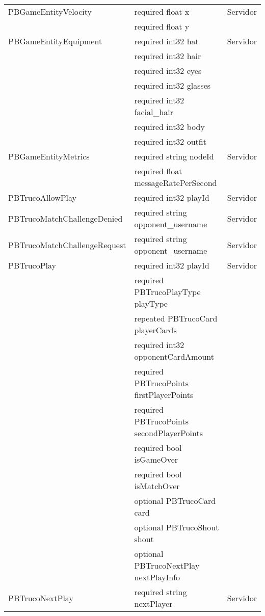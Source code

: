 \begin{longtable}{|l|l|l|}
    \hline
    PBGameEntityVelocity & required float x & Servidor \\
                            & required float y & \\
    \hline
    PBGameEntityEquipment & required int32 hat & Servidor \\
                            & required int32 hair & \\
                            & required int32 eyes & \\
                            & required int32 glasses & \\
                            & required int32 facial\_hair & \\
                            & required int32 body & \\
                            & required int32 outfit & \\
    \hline
    PBGameEntityMetrics & required string nodeId & Servidor \\
                        & required float messageRatePerSecond & \\
    \hline
    PBTrucoAllowPlay & required int32 playId & Servidor \\
    \hline
    PBTrucoMatchChallengeDenied & required string opponent\_username & Servidor \\
    \hline
    PBTrucoMatchChallengeRequest & required string opponent\_username & Servidor \\
    \hline
    PBTrucoPlay & required int32 playId & Servidor \\
                & required PBTrucoPlayType playType & \\
                & repeated PBTrucoCard playerCards & \\
                & required int32 opponentCardAmount & \\
                & required PBTrucoPoints firstPlayerPoints & \\
                & required PBTrucoPoints secondPlayerPoints & \\
                & required bool isGameOver & \\
                & required bool isMatchOver & \\
                & optional PBTrucoCard card & \\
                & optional PBTrucoShout shout & \\
                & optional PBTrucoNextPlay nextPlayInfo & \\
    \hline
    PBTrucoNextPlay & required string nextPlayer & Servidor \\

\end{longtable}
